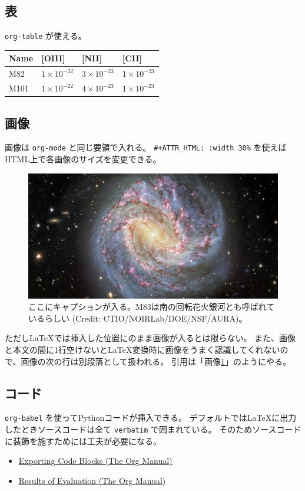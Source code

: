 \documentclass[a4paper, 10pt, notitlepage, uplatex, dvipdfmx]{jsarticle}
\begin{document}
\subsection{表}
\label{sec:org33391cc}
\texttt{org-table} が使える。

\begin{center}
\begin{tabular}{llll}
\hline
\hline
Name & {[}OIII] & {[}NII] & {[}CII]\\
\hline
M82 & \(1\times10^{-22}\) & \(3\times10^{-23}\) & \(1\times10^{-23}\)\\
M101 & \(1\times10^{-22}\) & \(4\times10^{-23}\) & \(1\times10^{-23}\)\\
\hline
\end{tabular}
\end{center}
\subsection{画像}
\label{sec:org0517414}
画像は \texttt{org-mode} と同じ要領で入れる。
\texttt{\#+ATTR\_HTML: :width 30\%} を使えばHTML上で各画像のサイズを変更できる。

\begin{figure}[htbp]
\centering
\includegraphics[width=.9\linewidth]{m83.jpg}
\caption{\label{fig:m83}ここにキャプションが入る。M83は南の回転花火銀河とも呼ばれているらしい (Credit: CTIO/NOIRLab/DOE/NSF/AURA)。}
\end{figure}

ただし\LaTeX{}では挿入した位置にのまま画像が入るとは限らない。
また、画像と本文の間に1行空けないと\LaTeX{}変換時に画像をうまく認識してくれないので、画像の次の行は別段落として扱われる。
引用は「画像\ref{fig:m83}」のようにやる。
\subsection{コード}
\label{sec:org3393c03}
\texttt{org-babel} を使ってPythonコードが挿入できる。
デフォルトでは\LaTeX{}に出力したときソースコードは全て \texttt{verbatim} で囲まれている。
そのためソースコードに装飾を施すためには工夫が必要になる。
\begin{itemize}
\item \href{https://orgmode.org/manual/Exporting-Code-Blocks.html}{Exporting Code Blocks (The Org Manual)}
\item \href{https://orgmode.org/manual/Results-of-Evaluation.html}{Results of Evaluation (The Org Manual)}
\end{itemize}
\end{document}
